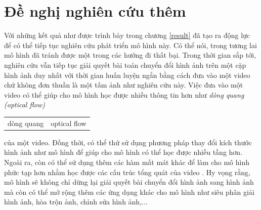 \documentclass[12pt]{report}%
\newcommand{\word}[2]{%
    \refstepcounter{word}%
    \textit{#1 (#2)}%
    \addcontentsline{wor}{word}
    {\protect
    \begin{tabular}{p{6.2cm}p{6cm}}
        \MakeLowercase{#1} & \MakeLowercase{#2}\\
    \end{tabular}
    }
}
\begin{document}
\clearpage

\chapter{Đề nghị nghiên cứu thêm}
Với những kết quả như được trình bày trong chương \ref{result} đã tạo ra  động lực để  có thể tiếp tục nghiên cứu phát triển mô hình này. Có thể nói, trong tương lai mô hình đã tránh được một trong các hướng đi thất bại. Trong thời gian sắp tới, nghiên cứu vẫn tiếp tục giải quyết bài toán chuyển đổi hình ảnh  trên một cặp hình ảnh duy nhất với thời gian huấn luyện ngắn bằng cách đưa vào một video chứ không đơn thuần là một tấm ảnh như nghiên cứu này. Việc đưa vào một video có thể giúp cho mô hình học được nhiều thông tin hơn như \word{dòng quang}{optical flow}của một video. Đồng thời,  có thể thử sử dụng phương pháp thay đổi kích thước hình ảnh như mô hình \cite{benaim2020structuralanalogy}  để giúp cho mô hình có thể học được nhiều tầng hơn. Ngoài ra, còn có thể sử dụng thêm các hàm mất mát khác để làm cho mô hình phức tạp hơn nhằm học được các cấu trúc tổng quát của video .
Hy vọng rằng, mô hình sẽ không chỉ dừng lại giải quyết bài chuyển đổi hình ảnh sang hình ảnh mà còn có thể mở rộng thêm các ứng dụng khác cho mô hình như siêu phân giải hình ảnh, hòa trộn ảnh, chỉnh sửa hình ảnh,...


\clearpage
\printbibliography[title={Tài liệu tham khảo}]
\end{document}
